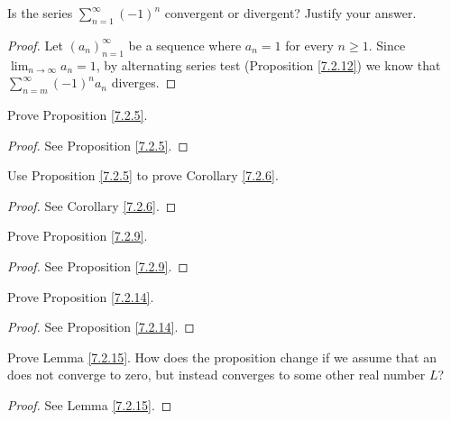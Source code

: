 \exercisesection

\begin{exercise}\label{ex 7.2.1}
    Is the series \(\sum_{n = 1}^\infty (-1)^n\) convergent or divergent?
    Justify your answer.
\end{exercise}

\begin{proof}
    Let \((a_n)_{n = 1}^\infty\) be a sequence where \(a_n = 1\) for every \(n \geq 1\).
    Since \(\lim_{n \to \infty} a_n = 1\), by alternating series test (Proposition \ref{7.2.12}) we know that \(\sum_{n = m}^\infty (-1)^n a_n\) diverges.
\end{proof}

\begin{exercise}\label{ex 7.2.2}
    Prove Proposition \ref{7.2.5}.
\end{exercise}

\begin{proof}
    See Proposition \ref{7.2.5}.
\end{proof}

\begin{exercise}\label{ex 7.2.3}
    Use Proposition \ref{7.2.5} to prove Corollary \ref{7.2.6}.
\end{exercise}

\begin{proof}
    See Corollary \ref{7.2.6}.
\end{proof}

\begin{exercise}\label{ex 7.2.4}
    Prove Proposition \ref{7.2.9}.
\end{exercise}

\begin{proof}
    See Proposition \ref{7.2.9}.
\end{proof}

\begin{exercise}\label{ex 7.2.5}
    Prove Proposition \ref{7.2.14}.
\end{exercise}

\begin{proof}
    See Proposition \ref{7.2.14}.
\end{proof}

\begin{exercise}\label{ex 7.2.6}
    Prove Lemma \ref{7.2.15}.
    How does the proposition change if we assume that an does not converge to zero, but instead converges to some other real number \(L\)?
\end{exercise}

\begin{proof}
    See Lemma \ref{7.2.15}.
\end{proof}